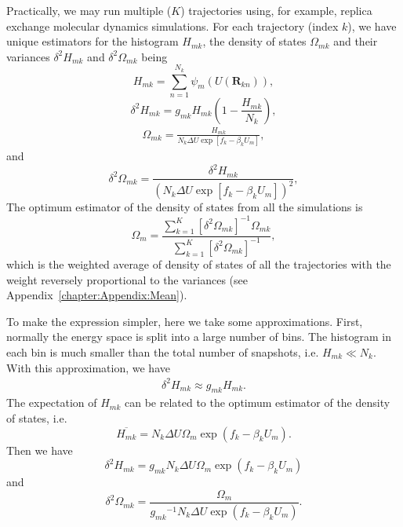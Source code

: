 Practically, we may run multiple ($K$) trajectories using, for example, replica exchange molecular dynamics simulations. For each trajectory (index $k$), we have unique estimators for the histogram $H_{mk}$, the density of states $\Omega_{mk}$ and their variances $\delta^2 H_{mk}$ and $\delta^2\Omega_{mk}$ being
\begin{equation}
	H_{mk}=\sum\limits_{n=1}^{N_k}\psi_{m}(U(\mathbf{R}_{kn})),
\end{equation}
\begin{equation}
	\delta^2 H_{mk}=g_{mk}H_{mk}\left(1-\frac{H_{mk}}{N_k}\right),
\end{equation}
\begin{align}
	\Omega_{mk}=\frac{H_{mk}}{N_k\Delta U\exp{\left[f_k-\beta_kU_{m}\right]}},
	\label{Eq:FEM:WHAM:Omega_mk}
\end{align}
and
\begin{equation}
	\delta^2\Omega_{mk}=\frac{\delta^2 H_{mk}}{\left(N_k\Delta U\exp{\left[f_k-\beta_kU_{m}\right]}\right)^2},
\end{equation}
The optimum estimator of the density of states from all the simulations is
\begin{equation}
	\Omega_m=\frac{\sum\limits_{k=1}^K\left[\delta^2\Omega_{mk}\right]^{-1}\Omega_{mk}}{\sum\limits_{k=1}^K\left[\delta^2\Omega_{mk}\right]^{-1}},
	\label{Eq:FEM:WHAM:optimumOmega}
\end{equation}
which is the weighted average of density of states of all the trajectories with the weight reversely proportional to the variances (see Appendix~\ref{chapter:Appendix:Mean}).

To make the expression simpler, here we take some approximations. First, normally the energy space is split into a large number of bins. The histogram in each bin is much smaller than the total number of snapshots, i.e. $H_{mk}\ll N_k$. With this approximation, we have
\begin{align}
	\delta^2 H_{mk}\approx g_{mk}H_{mk}.
\end{align}
The expectation of $H_{mk}$ can be related to the optimum estimator of the density of states, i.e.
\begin{equation}
	\overline{H_{mk}}=N_k\Delta U\Omega_m\exp{(f_k-\beta_kU_m)}.
\end{equation}
Then we have
\begin{equation}
    \delta^2H_{mk}=g_{mk}N_k\Delta U\Omega_m\exp{(f_k-\beta_kU_m)}
    \label{EQ:FEM:WHAM:delta2H_mk}
\end{equation}
and
\begin{equation}
\delta^2\Omega_{mk}=\frac{\Omega_m}{{g_{mk}}^{-1}N_k\Delta U\exp{(f_k-\beta_kU_m)}}.
\label{Eq:FEM:WHAM:delta2Omega_mk}
\end{equation}

